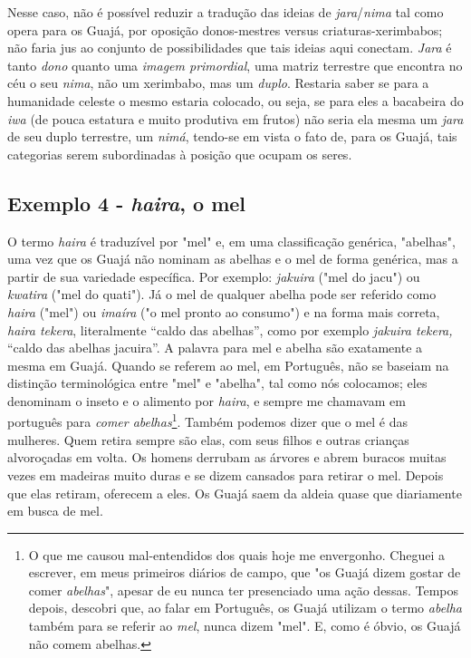 Nesse caso, não é possível reduzir a tradução das ideias de
\emph{jara}/\emph{nima} tal como opera para os Guajá, por oposição
donos-mestres versus criaturas-xerimbabos; não faria jus ao conjunto de
possibilidades que tais ideias aqui conectam. \emph{Jara} é tanto
\emph{dono} quanto uma \emph{imagem primordial}, uma matriz terrestre
que encontra no céu o seu \emph{nima}, não um xerimbabo, mas um
\emph{duplo}. Restaria saber se para a humanidade celeste o mesmo
estaria colocado, ou seja, se para eles a bacabeira do \emph{iwa} (de
pouca estatura e muito produtiva em frutos) não seria ela mesma um
\emph{jara} de seu duplo terrestre, um \emph{nimá}, tendo-se em vista o
fato de, para os Guajá, tais categorias serem subordinadas à posição que
ocupam os seres.

\subsection{Exemplo 4 - \emph{haira}, o mel}

O termo \emph{haira} é traduzível por "mel" e, em uma classificação
genérica, "abelhas", uma vez que os Guajá não nominam as abelhas e o mel
de forma genérica, mas a partir de sua variedade específica. Por
exemplo: \emph{jakuira} ("mel do jacu") ou \emph{kwatira} ("mel do
quati"). Já o mel de qualquer abelha pode ser referido como \emph{haira}
("mel") ou \emph{imaíra} ("o mel pronto ao consumo") e na forma mais
correta, \emph{haira tekera}, literalmente ``caldo das abelhas'', como
por exemplo \emph{jakuira tekera,} ``caldo das abelhas jacuira''. A
palavra para mel e abelha são exatamente a mesma em Guajá. Quando se
referem ao mel, em Português, não se baseiam na distinção terminológica
entre "mel" e "abelha", tal como nós colocamos; eles denominam o inseto
e o alimento por \emph{haira}, e sempre me chamavam em português para
\emph{comer abelhas}\footnote{O que me causou mal-entendidos dos quais
  hoje me envergonho. Cheguei a escrever, em meus primeiros diários de
  campo, que "os Guajá dizem gostar de comer \emph{abelhas}", apesar de
  eu nunca ter presenciado uma ação dessas. Tempos depois, descobri que,
  ao falar em Português, os Guajá utilizam o termo \emph{abelha} também
  para se referir ao \emph{mel}, nunca dizem "mel". E, como é óbvio, os
  Guajá não comem abelhas.}. Também podemos dizer que o mel é das
mulheres. Quem retira sempre são elas, com seus filhos e outras crianças
alvoroçadas em volta. Os homens derrubam as árvores e abrem buracos
muitas vezes em madeiras muito duras e se dizem cansados para retirar o
mel. Depois que elas retiram, oferecem a eles. Os Guajá saem da aldeia
quase que diariamente em busca de mel. 

